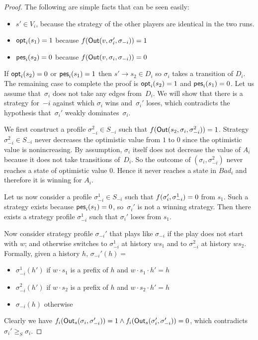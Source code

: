 \begin{proof}
The following are simple facts that can be seen easily:

\begin{itemize}
\item   \(s' \in V_i\), because the strategy of the other players
  are identical in the two runs.
\item   \(\textsf{opt}_i(s_1) = 1\) because
  \(f(\textsf{Out}(v,\sigma_i',\sigma_{-i}))=1\)
\item   \(\textsf{pes}_i(s_2) = 0\) because
  \(f(\textsf{Out}(v,\sigma_i,\sigma_{-i}))=0\)
\end{itemize}

If \(\textsf{opt}_i(s_2) = 0\) or \(\textsf{pes}_i(s_1) = 1\) then
\(s' \rightarrow s_2 \in D_i\) so \(\sigma_i\) takes a transition of
\(D_i\). The remaining case to complete the proof is \(\textsf{opt}_i(s_2) = 1\)
and \(\textsf{pes}_i(s_1) = 0\).
Let us assume that~$\sigma_i$ does not take any edges from~$D_i$.
We will show that there is
a strategy for~$-i$ against which $\sigma_i$ wins and~$\sigma_i'$ loses,
which contradicts the hypothesis that~$\sigma_i'$ weakly dominates~$\sigma_i$.

We first construct a profile \(\sigma_{-i}^2 \in S_{-i}\) such that
\(f(\textsf{Out}(s_2,\sigma_i,\sigma_{-i}^2))=1\).
Strategy \(\sigma_{-i}^2\in S_{-i}\) never decreases
the optimistic value from \(1\) to \(0\) since the optimistic value is nonincreasing.
By assumption, \(\sigma_i\)
itself does not decrease the value of \(A_i\) because it does not take
transitions of~\(D_i\). So the outcome of \((\sigma_i,\sigma_{-i}^2)\)
never reaches a state of optimistic value \(0\). Hence it never reaches
a state in \(Bad_i\) and therefore it is winning for \(A_i\).

Let us now consider a profile \(\sigma_{-i}^1 \in S_{-i}\) such that
\(f(\sigma_i',\sigma_{-i}^1)=0\) from \(s_1\). Such a strategy exists
because
\(\textsf{pes}_i(s_1) = 0\), so~$\sigma_i'$ is not a winning strategy.
Then there exists a
strategy profile \(\sigma_{-i}^1\) such that \(\sigma_i'\) loses from
\(s_1\).

Now consider strategy profile \(\sigma_{-i}'\) that plays like
\(\sigma_{-i}\) if the play does not start with \(w\);
and otherwise switches to
\(\sigma_{-i}^1\) at history \(ws_1\) and to \(\sigma_{-i}^2\) at history \(ws_2\).
Formally, given a history \(h\), \(\sigma_{-i}'(h) =\)

\begin{itemize}
\item   \(\sigma_{-i}^1( h')\) if \(w \cdot s_1\) is a prefix of \(h\) and
  \(w \cdot s_1 \cdot h' = h\)
\item   \(\sigma_{-i}^2( h')\) if \(w \cdot s_2\) is a prefix of \(h\) and
  \(w \cdot s_2 \cdot h' = h\)
\item   \(\sigma_{-i}(h)\) otherwise
\end{itemize}

Clearly we have
\(f_i(\textsf{Out}_s(\sigma_i,\sigma_{-i}'))= 1 \wedge f_i(\textsf{Out}_s(\sigma_i',\sigma_{-i}')) = 0\),
which contradicts \(\sigma_i' \ge_S \sigma_i\).
\end{proof}

